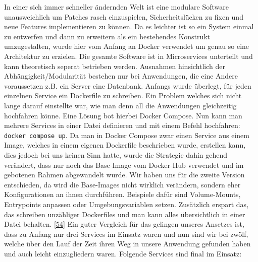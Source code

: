 \documentclass[
    headings=optiontotocandhead,%
    twoside,
    numbers=noenddot,%
    12pt, %
    titlepage, %
    parskip=full, %
    listof=leveldown, 
    numbers=noenddot, %
    a4paper,DIV=14,
    BCOR=15mm,
]{scrbook}
\newcommand{\passthrough}[1]{#1}
\begin{document}
In einer sich immer schneller ändernden Welt ist eine modulare Software
unausweichlich um Patches rasch einzuspielen, Sicherheitslücken zu fixen
und neue Features implementieren zu können. Da es leichter ist so ein
System einmal zu entwerfen und dann zu erweitern als ein bestehendes
Konstrukt umzugestalten, wurde hier vom Anfang an Docker verwendet um
genau so eine Architektur zu erzielen. Die gesamte Software ist in
Microservices unterteilt und kann theoretisch seperat betrieben werden.
Ausnahmen hinsichtlich der Abhängigkeit/Modularität bestehen nur bei
Anwendungen, die eine Andere voraussetzen z.B. ein Server eine
Datenbank. Anfangs wurde überlegt, für jeden einzelnen Service ein
Dockerfile zu schreiben. Ein Problem welches sich nicht lange darauf
einstellte war, wie man denn all die Anwendungen gleichzeitig hochfahren
könne. Eine Lösung bot hierbei Docker Compose. Nun kann man mehrere
Services in einer Datei definieren und mit einem Befehl hochfahren:
\passthrough{\lstinline!docker compose up!}. Da man in Docker Compose
zwar einen Service aus einem Image, welches in einem eigenen Dockerfile
beschrieben wurde, erstellen kann, dies jedoch bei uns keinen Sinn
hatte, wurde die Strategie dahin gehend verändert, dass nur noch das
Base-Image vom Docker-Hub verwendet und im gebotenen Rahmen abgewandelt
wurde. Wir haben uns für die zweite Version entschieden, da wird die
Base-Images nicht wirklich verändern, sondern eher Konfigurationen an
ihnen durchführen. Beispiele dafür sind Volume-Mounts, Entrypoints
anpassen oder Umgebungsvariablen setzen. Zusätzlich erspart das, das
schreiben unzähliger Dockerfiles und man kann alles übersichtlich in
einer Datei behalten.
{[}\protect\hyperlink{ref-gpt-server-structure}{54}{]} Ein guter
Vergleich für das gelingen unseres Ansetzes ist, dass zu Anfang nur drei
Services im Einsatz waren und nun sind wir bei zwölf, welche über den
Lauf der Zeit ihren Weg in unsere Anwendung gefunden haben und auch
leicht einzugliedern waren. Folgende Services sind final im Einsatz:
\end{document}
